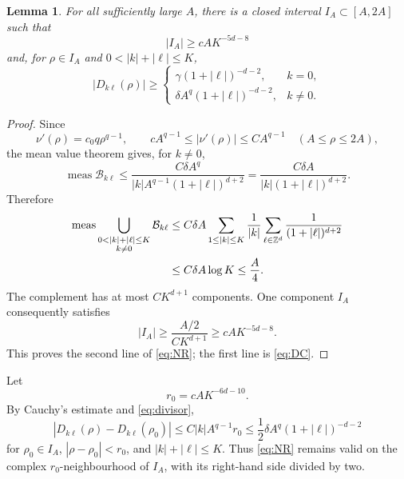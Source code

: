 \documentclass[11pt]{amsart}
\newtheorem{lemma}[theorem]{Lemma}
\theoremstyle{remark}
\newcommand{\Z}{\mathbb Z}
\begin{document}
\begin{lemma}\label{lem:nonresonance}
For all sufficiently large $A$, there is a closed interval
$I_A\subset[A,2A]$ such that
\begin{equation}\label{eq:IAlength}
 |I_A|\geq cAK^{-5d-8}
\end{equation}
and, for $\rho\in I_A$ and
$0<|k|+|\ell|\leq K$,
\begin{equation}\label{eq:NR}
 |D_{k\ell}(\rho)|\geq
 \begin{cases}
 \gamma(1+|\ell|)^{-d-2},& k=0,\\[2mm]
 \delta A^q(1+|\ell|)^{-d-2},& k\neq0.
 \end{cases}
\end{equation}
\end{lemma}

\begin{proof}
Since
\[
 \nu'(\rho)=c_0q\rho^{q-1},\qquad
 cA^{q-1}\leq|\nu'(\rho)|\leq CA^{q-1}
 \quad(A\leq\rho\leq2A),
\]
the mean value theorem gives, for $k\neq0$,
\begin{equation}\label{eq:badmeasure1}
 \operatorname{meas}\mathcal B_{k\ell}
 \leq
 \frac{C\delta A^q}
 {|k|A^{q-1}(1+|\ell|)^{d+2}}
 =
 \frac{C\delta A}
 {|k|(1+|\ell|)^{d+2}}.
\end{equation}
Therefore
\begin{align}
 \operatorname{meas}
 \bigcup_{\substack{0<|k|+|\ell|\leq K\\ k\neq0}}
 \mathcal B_{k\ell}
 &\leq
 C\delta A
 \sum_{1\leq|k|\leq K}\frac1{|k|}
 \sum_{\ell\in\Z^d}\frac1{(1+|\ell|)^{d+2}}
 \notag\\
 &\leq C\delta A\log K
 \leq \frac A4. \label{eq:badmeasure2}
\end{align}
The complement has at most $CK^{d+1}$ components.  One component
$I_A$ consequently satisfies
\[
 |I_A|\geq
 \frac{A/2}{CK^{d+1}}
 \geq cAK^{-5d-8}.
\]
This proves the second line of \eqref{eq:NR}; the first line is
\eqref{eq:DC}.
\end{proof}

Let
\begin{equation}\label{eq:r0}
 r_0=cAK^{-6d-10}.
\end{equation}
By Cauchy's estimate and \eqref{eq:divisor},
\[
 |D_{k\ell}(\rho)-D_{k\ell}(\rho_0)|
 \leq C|k|A^{q-1}r_0
 \leq \frac12\delta A^q(1+|\ell|)^{-d-2}
\]
for $\rho_0\in I_A$, $|\rho-\rho_0|<r_0$, and
$|k|+|\ell|\leq K$.  Thus \eqref{eq:NR} remains valid on the complex
$r_0$-neighbourhood of $I_A$, with its right-hand side divided by two.
\end{document}

